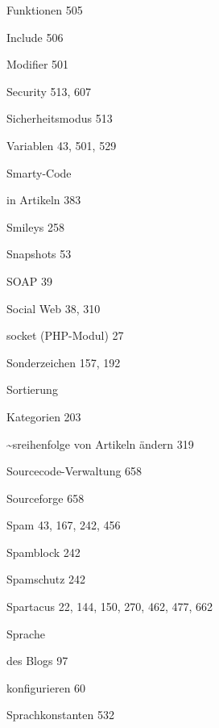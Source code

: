 \documentclass{book}
\renewcommand\subitem{\par}
\begin{document}
\begin{multicols}{2}
\begin{osp-index}
    \subitem Funktionen\hspace{1mm} 505
    \subitem Include\hspace{1mm} 506
    \subitem Modifier\hspace{1mm} 501
    \subitem Security\hspace{1mm} 513, 607
    \subitem Sicherheitsmodus\hspace{1mm} 513
    \subitem Variablen\hspace{1mm} 43, 501, 529
  \item Smarty-Code
    \subitem in Artikeln\hspace{1mm} 383
  \item Smileys\hspace{1mm} 258
  \item Snapshots\hspace{1mm} 53
  \item SOAP\hspace{1mm} 39
  \item Social Web\hspace{1mm} 38, 310
  \item socket (PHP-Modul)\hspace{1mm} 27
  \item Sonderzeichen\hspace{1mm} 157, 192
  \item Sortierung
    \subitem Kategorien\hspace{1mm} 203
    \subitem \textasciitilde{}sreihenfolge von Artikeln \"andern\hspace{1mm} 
		319
  \item Sourcecode-Verwaltung\hspace{1mm} 658
  \item Sourceforge\hspace{1mm} 658
  \item Spam\hspace{1mm} 43, 167, 242, 456
  \item Spamblock\hspace{1mm} 242
  \item Spamschutz\hspace{1mm} 242
  \item Spartacus\hspace{1mm} 22, 144, 150, 270, 462, 477, 662
  \item Sprache
    \subitem des Blogs\hspace{1mm} 97
    \subitem konfigurieren\hspace{1mm} 60
  \item Sprachkonstanten\hspace{1mm} 532

\end{osp-index}
\end{multicols}
\end{document}
